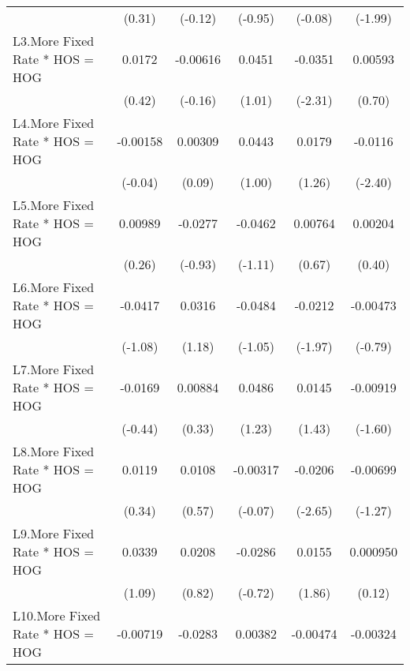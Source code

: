 {\begin{longtable}{l*{5}{c}}
                &   (0.31)         &  (-0.12)         &  (-0.95)         &  (-0.08)         &  (-1.99)         \\
[1em]
L3.More Fixed Rate * HOS = HOG&   0.0172         & -0.00616         &   0.0451         &  -0.0351\sym{*}  &  0.00593         \\
                &   (0.42)         &  (-0.16)         &   (1.01)         &  (-2.31)         &   (0.70)         \\
[1em]
L4.More Fixed Rate * HOS = HOG& -0.00158         &  0.00309         &   0.0443         &   0.0179         &  -0.0116\sym{*}  \\
                &  (-0.04)         &   (0.09)         &   (1.00)         &   (1.26)         &  (-2.40)         \\
[1em]
L5.More Fixed Rate * HOS = HOG&  0.00989         &  -0.0277         &  -0.0462         &  0.00764         &  0.00204         \\
                &   (0.26)         &  (-0.93)         &  (-1.11)         &   (0.67)         &   (0.40)         \\
[1em]
L6.More Fixed Rate * HOS = HOG&  -0.0417         &   0.0316         &  -0.0484         &  -0.0212         & -0.00473         \\
                &  (-1.08)         &   (1.18)         &  (-1.05)         &  (-1.97)         &  (-0.79)         \\
[1em]
L7.More Fixed Rate * HOS = HOG&  -0.0169         &  0.00884         &   0.0486         &   0.0145         & -0.00919         \\
                &  (-0.44)         &   (0.33)         &   (1.23)         &   (1.43)         &  (-1.60)         \\
[1em]
L8.More Fixed Rate * HOS = HOG&   0.0119         &   0.0108         & -0.00317         &  -0.0206\sym{**} & -0.00699         \\
                &   (0.34)         &   (0.57)         &  (-0.07)         &  (-2.65)         &  (-1.27)         \\
[1em]
L9.More Fixed Rate * HOS = HOG&   0.0339         &   0.0208         &  -0.0286         &   0.0155         & 0.000950         \\
                &   (1.09)         &   (0.82)         &  (-0.72)         &   (1.86)         &   (0.12)         \\
[1em]
L10.More Fixed Rate * HOS = HOG& -0.00719         &  -0.0283         &  0.00382         & -0.00474         & -0.00324         \\

\end{longtable}}

